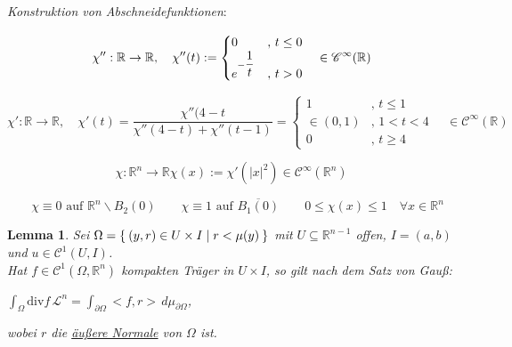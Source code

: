 \documentclass[11pt]{memoir}
\theoremstyle{changebreak}
\newtheorem{Lemma}{Lemma}[chapter]
\begin{document}
\par\bigskip
\emph{Konstruktion von Abschneidefunktionen}: 
\par\bigskip
\begin{equation}
	\chi '': \mathbb R \rightarrow \mathbb R, 
	\quad \chi''(t) :=
	\begin{cases}
		0 & , \,t \leq 0 \\
		e^{-\dfrac{1}{t}} & ,\,t > 0
	\end{cases}
	\quad \in \mathscr C^\infty(\mathbb R) \\
\end{equation}
\par
\begin{equation}
	\chi': \mathbb R \rightarrow \mathbb R, \quad \chi'(t) =
	\dfrac{\chi''(4-t}{\chi''(4-t) + \chi''(t-1)} =
	\begin{cases}
		1 & , \, t \leq 1 \\
		\in (0, 1) &, \, 1 < t < 4 \\
		0 & ,\, t \geq 4
	\end{cases}
	\quad \in \mathscr C^\infty(\mathbb R)
\end{equation}
\par
\begin{equation}
	\chi: \mathbb R^n \rightarrow \mathbb R
	\chi(x) := \chi'(|x|^2) \in \mathscr C^\infty (\mathbb R^n)
\end{equation}
\par
\begin{equation}
	\quad \chi \equiv 0 \text{ auf } \mathbb R^n\backslash B_2(0)
	\qquad \chi \equiv 1\text{ auf }\overline{B_1(0)}
	\qquad 0 \leq \chi(x) \leq 1 \quad \forall x \in \mathbb R^n
\end{equation}

\begin{Lemma}
Sei $\Omega = \Set{(y, r) \in U \times I | r < \mu(y)}$ mit $U \subseteq \mathbb R^{n-1}$ offen, $I = (a, b)$ und $u \in \mathscr C^1(U, I)$. \\
Hat $f \in \mathscr C^1(\Omega, \mathbb R^n)$ kompakten Träger in $U \times I$, so gilt nach dem Satz von Gauß:
\begin{center}
	$\int_{\Omega} \text{div} f \, \mathscr L^n = \int_{\partial \Omega} <f, r> \, d\mu_{\partial\Omega}$,
\end{center}
wobei $r$ die \underline{äußere Normale} von $\Omega$ ist.
\end{Lemma}
\end{document}
